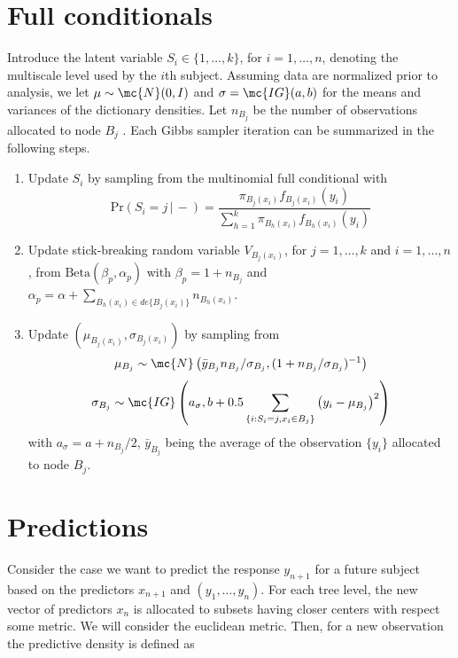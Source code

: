 %
%
%
%
%
%
%
%
%
%
%
%
%
%
%
%
%
%
%
%
%
%
%
%
%
%
%
%
%
%
%
%
%
%
%
%
%
%
%
%
%
%
%
%
%
%
%
%
%
%
%
%
%
%
%
%
%
%
%
%
%
%
%
%
%
%
%
%
%
%
%
%
%
%
\maketitle
\section{Full conditionals}
Introduce the latent variable $S_i \in \{1,\ldots,k\}$, for $i=1,\ldots,n$, denoting the multiscale level used by the $i$th subject.  Assuming data are normalized prior to analysis, we let $\mu \sim \mc{N}(0,I)$ and $\sigma=\mc{IG}(a,b)$ for the means and variances of the dictionary densities. Let $n_{B_j}$ be  the number of observations allocated to node $B_j$ . Each Gibbs sampler iteration can be summarized in the following steps.
\begin{enumerate}
\item Update $S_i$ by sampling from the multinomial full conditional with 
\[\mbox{Pr}( S_i = j\, |\, -) = \frac{ \pi_{B_j(x_i)}f_{B_j(x_i)}(y_i) }{ \sum_{h=1}^k \pi_{B_h(x_i)}f_{B_h(x_i)}(y_i) } \label{eq:prS}\]
\item Update stick-breaking random variable $V_{B_j(x_i)}$, for $j=1, \ldots, k$ and $i=1, \ldots, n$, from $\mbox{Beta}(\beta_p,\alpha_p)$ with $\beta_p=1+n_{B_j}$ and $\alpha_p=\alpha+\sum_{B_h(x_i) \in de\{B_j(x_i)\}} n_{B_h(x_i)}$.
\item Update $(\mu_{B_j(x_i)},\sigma_{B_j(x_i)})$ by sampling from
\[  \mu_{B_j} \sim \mc{N}\left(\bar{y}_{B_j} n_{B_j}/\sigma_{B_j},(1+n_{B_j}/\sigma_{B_j})^{-1}\right)\]
\[ \sigma_{B_j} \sim \mc{IG}\left(a_{\sigma},b+0.5\sum_{\{i: S_i=j,x_i \in B_j\}} \left(y_{i}-\mu_{B_j}\right)^2\right)\]
with $a_{\sigma}=a+n_{B_j}/2$, $\bar{y}_{B_j}$ being the average of the observation $\{y_i\}$ allocated to node $B_j$.
\end{enumerate}


\section{Predictions}\label{ch3:predictions}
Consider the case we want to predict the response $y_{n+1}$ for a future  subject based on the predictors $x_{n+1}$ and $(y_1, \ldots, y_n)$. For each tree level, the new vector of predictors $x_n$ is allocated to subsets having closer centers with respect some metric. We will consider the euclidean metric. Then, for a new observation the predictive density is defined as

